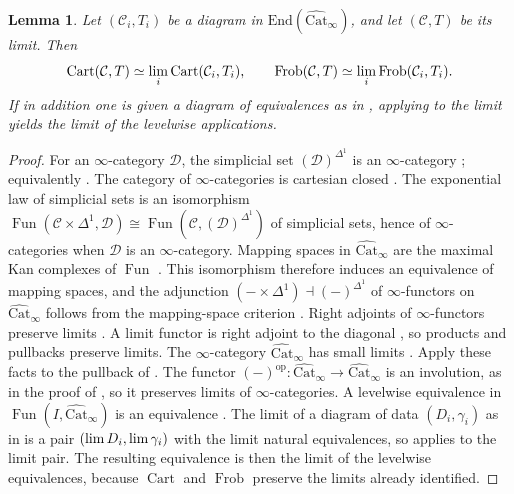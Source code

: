 \documentclass[11pt]{amsart}
\newcommand{\cC}{\mathcal{C}}
\newcommand{\cD}{\mathcal{D}}
\newcommand{\Cart}{\operatorname{Cart}}
\newcommand{\op}{{\operatorname{op}}}
\renewcommand{\lim}{\operatornamewithlimits{\rm{lim}}}
\DeclareMathOperator{\Fun}{\mathrm{Fun}}
\newcommand{\Catbig}{\widehat{\mathrm{Cat}}}
\newcommand{\Frob}{\operatorname{Frob}}
\theoremstyle{plain}
\newtheorem{lemma}[lemma]{Lemma}
\theoremstyle{definition}
\numberwithin{equation}{section}
\begin{document}
\begin{lemma}\label{lem:leq-limits}
Let $(\cC_i,T_i)$ be a diagram in $\mathrm{End}(\Catbig_\infty)$, and let $(\cC,T)$ be its limit.
Then
\[
 \Cart(\cC,T)\simeq\lim_i\Cart(\cC_i,T_i),\qquad
 \Frob(\cC,T)\simeq\lim_i\Frob(\cC_i,T_i).
\]
If in addition one is given a diagram of equivalences as in , applying  to the limit yields the limit of the levelwise applications.
\end{lemma}
\begin{proof}
For an $\infty$-category $\cD$, the simplicial set $(\cD)^{\Delta^1}$ is an $\infty$-category \cite[\href{https://kerodon.net/tag/0066}{Tag 0066}]{Kerodon}; equivalently \cite[Proposition 1.2.7.3]{HTT}.
The category of $\infty$-categories is cartesian closed \cite[\href{https://kerodon.net/tag/05UH}{Tag 05UH}]{Kerodon}.
The exponential law of simplicial sets \cite[\href{https://kerodon.net/tag/0061}{Tag 0061}]{Kerodon} is an isomorphism $\Fun(\cC\times\Delta^1,\cD)\cong\Fun(\cC,(\cD)^{\Delta^1})$ of simplicial sets, hence of $\infty$-categories when $\cD$ is an $\infty$-category.
Mapping spaces in $\Catbig_\infty$ are the maximal Kan complexes of $\Fun$ \cite[Definition 3.0.0.1]{HTT}.
This isomorphism therefore induces an equivalence of mapping spaces, and the adjunction $(-\times\Delta^1)\dashv(-)^{\Delta^1}$ of $\infty$-functors on $\Catbig_\infty$ follows from the mapping-space criterion \cite[Proposition 5.2.2.8]{HTT}.
Right adjoints of $\infty$-functors preserve limits \cite[Proposition 5.2.3.5]{HTT}.
A limit functor is right adjoint to the diagonal \cite[\href{https://kerodon.net/tag/02JL}{Tag 02JL}]{Kerodon}, so products and pullbacks preserve limits.
The $\infty$-category $\Catbig_\infty$ has small limits \cite[Corollary 4.2.4.8; Remark 3.0.0.5]{HTT}.
Apply these facts to the pullback of .
The functor $(-)^{\op}:\Catbig_\infty\to\Catbig_\infty$ is an involution, as in the proof of , so it preserves limits of $\infty$-categories.
A levelwise equivalence in $\Fun(I,\Catbig_\infty)$ is an equivalence \cite[\href{https://kerodon.net/tag/01DK}{Tag 01DK}]{Kerodon}.
The limit of a diagram of data $(D_i,\gamma_i)$ as in  is a pair $(\lim D_i,\lim\gamma_i)$ with the limit natural equivalences, so  applies to the limit pair.
The resulting equivalence is then the limit of the levelwise equivalences, because $\Cart$ and $\Frob$ preserve the limits already identified.
\end{proof}
\end{document}
